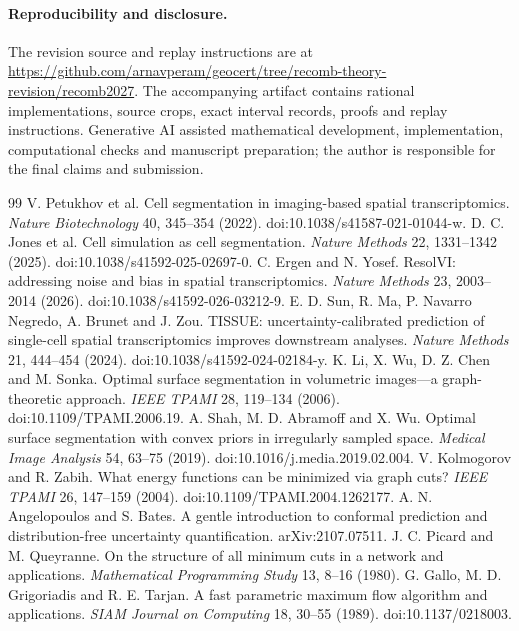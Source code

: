 \documentclass[10pt,letterpaper]{article}
\begin{document}
\paragraph{Reproducibility and disclosure.}
The revision source and replay instructions are at \url{https://github.com/arnavperam/geocert/tree/recomb-theory-revision/recomb2027}. The accompanying artifact contains rational implementations, source crops, exact interval records, proofs and replay instructions. Generative AI assisted mathematical development, implementation, computational checks and manuscript preparation; the author is responsible for the final claims and submission.

\clearpage
\begin{thebibliography}{99}
 V. Petukhov et al. Cell segmentation in imaging-based spatial transcriptomics. \emph{Nature Biotechnology} 40, 345--354 (2022). doi:10.1038/s41587-021-01044-w.
 D. C. Jones et al. Cell simulation as cell segmentation. \emph{Nature Methods} 22, 1331--1342 (2025). doi:10.1038/s41592-025-02697-0.
 C. Ergen and N. Yosef. ResolVI: addressing noise and bias in spatial transcriptomics. \emph{Nature Methods} 23, 2003--2014 (2026). doi:10.1038/s41592-026-03212-9.
 E. D. Sun, R. Ma, P. Navarro Negredo, A. Brunet and J. Zou. TISSUE: uncertainty-calibrated prediction of single-cell spatial transcriptomics improves downstream analyses. \emph{Nature Methods} 21, 444--454 (2024). doi:10.1038/s41592-024-02184-y.
 K. Li, X. Wu, D. Z. Chen and M. Sonka. Optimal surface segmentation in volumetric images---a graph-theoretic approach. \emph{IEEE TPAMI} 28, 119--134 (2006). doi:10.1109/TPAMI.2006.19.
 A. Shah, M. D. Abramoff and X. Wu. Optimal surface segmentation with convex priors in irregularly sampled space. \emph{Medical Image Analysis} 54, 63--75 (2019). doi:10.1016/j.media.2019.02.004.
 V. Kolmogorov and R. Zabih. What energy functions can be minimized via graph cuts? \emph{IEEE TPAMI} 26, 147--159 (2004). doi:10.1109/TPAMI.2004.1262177.
 A. N. Angelopoulos and S. Bates. A gentle introduction to conformal prediction and distribution-free uncertainty quantification. arXiv:2107.07511.
 J. C. Picard and M. Queyranne. On the structure of all minimum cuts in a network and applications. \emph{Mathematical Programming Study} 13, 8--16 (1980).
 G. Gallo, M. D. Grigoriadis and R. E. Tarjan. A fast parametric maximum flow algorithm and applications. \emph{SIAM Journal on Computing} 18, 30--55 (1989). doi:10.1137/0218003.

\end{thebibliography}
\end{document}
